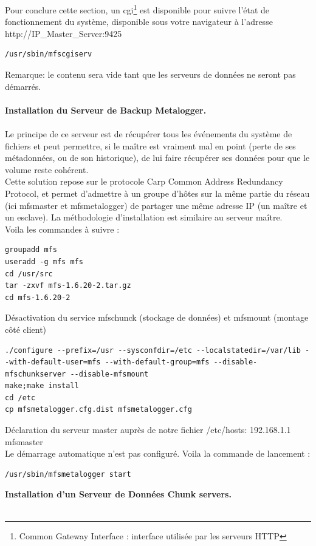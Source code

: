 \documentclass[12pt]{report}
\begin{document}
Pour conclure cette section, un cgi\footnote{Common Gateway Interface : interface utilisée par les serveurs HTTP} est disponible pour suivre l'état de fonctionnement du système, disponible sous votre navigateur à l'adresse http://IP\_Master\_Server:9425
          \begin{lstlisting}
/usr/sbin/mfscgiserv
	  \end{lstlisting}
Remarque: le contenu sera vide tant que les serveurs de données ne seront pas démarrés.\\\\
\newpage
\textbf{Installation du Serveur de Backup Metalogger.}\\\\
Le principe de ce serveur est de récupérer tous les événements du système de fichiers et peut permettre, si le maître est vraiment mal en point (perte de ses métadonnées, ou de son historique), de lui faire récupérer ses données pour que le volume reste cohérent.\\
Cette solution repose sur le protocole Carp \og Common Address Redundancy Protocol\fg, et permet d'admettre à un groupe d'hôtes sur la même partie du réseau (ici mfsmaster et mfsmetalogger) de partager une même adresse IP (un maître et un esclave). 
La méthodologie d'installation est similaire au serveur maître.\\
Voila les commandes à suivre :\\
  \begin{lstlisting}
groupadd mfs
useradd -g mfs mfs
cd /usr/src
tar -zxvf mfs-1.6.20-2.tar.gz
cd mfs-1.6.20-2
	  \end{lstlisting}
Désactivation du service mfschunck (stockage de données) et mfsmount (montage côté client)
  \begin{lstlisting}
./configure --prefix=/usr --sysconfdir=/etc --localstatedir=/var/lib --with-default-user=mfs --with-default-group=mfs --disable-mfschunkserver --disable-mfsmount
make;make install
cd /etc
cp mfsmetalogger.cfg.dist mfsmetalogger.cfg
	  \end{lstlisting}
Déclaration du serveur master auprès de notre fichier /etc/hosts: 192.168.1.1  mfsmaster\\
Le démarrage automatique n'est pas configuré. Voila la commande de lancement :
  \begin{lstlisting}
/usr/sbin/mfsmetalogger start
	  \end{lstlisting}
\textbf{Installation d'un Serveur de Données Chunk servers.}\\\\
\end{document}
